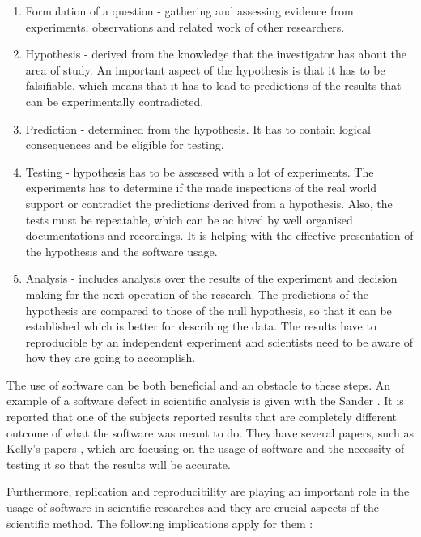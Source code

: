 \begin{enumerate}
\item Formulation of a question - gathering and assessing evidence from experiments, observations and related work of other researchers.

\item Hypothesis - derived from the knowledge that the investigator has about the area of study. An important aspect of the hypothesis is that it has to be falsifiable, which means that it has to lead to predictions of the results that can be experimentally contradicted. 

\item Prediction - determined from the hypothesis. It has to contain logical consequences and be eligible for testing.

\item Testing - hypothesis has to be assessed with a lot of experiments. The experiments has to determine if the made inspections of the real world support or contradict the predictions derived from a hypothesis. Also, the tests must be repeatable, which can be ac hived by well organised documentations and recordings. It is helping with the effective presentation of the hypothesis and the software usage.

\item Analysis - includes analysis over the results of the experiment and decision making for the next operation of the research. The predictions of the hypothesis are compared to those of the null hypothesis, so that it can be established which is better for describing the data. The results have to reproducible by an independent experiment and scientists need to be aware of how they are going to accomplish.

\end{enumerate}

The use of software can be both beneficial and an obstacle to these steps. An example of a software defect in scientific analysis is given with the Sander \cite{sanders2008dealing}. It is reported that one of the subjects reported results that are completely different outcome of what the software was meant to do. They have several papers, such as Kelly's papers \cite{kellyassessing}\cite{kelly2009five}, which are focusing on the usage of software and the necessity of testing it so that the results will be accurate. 

Furthermore, replication and reproducibility are playing an important role in the usage of software in scientific researches and they are crucial aspects of the scientific method. The following implications apply for them \cite{johansson2014introduction}\cite{peng2011reproducible}\cite{levequereproducible}:

